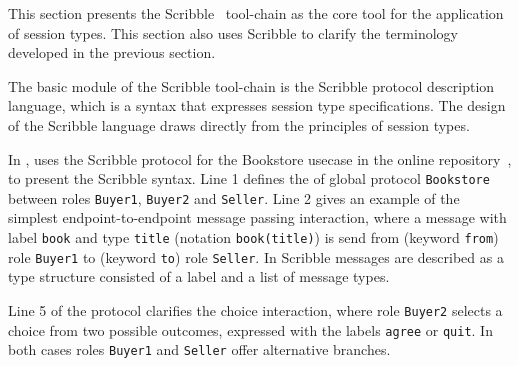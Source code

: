 This section presents the Scribble~\cite{scribble} tool-chain
as the core tool for the application of session types.
This section also uses Scribble to clarify the terminology
developed in the previous section.

The basic module of the Scribble tool-chain is the
Scribble protocol description language,
which is a syntax that expresses session type specifications.
The design of the Scribble language draws directly from
the principles of session types.





In , uses the Scribble protocol for the
Bookstore usecase in the online repository~\cite{usecase_repository},
to present the Scribble syntax.
Line 1 defines the 
of global protocol \lstinline|Bookstore| between
roles \lstinline|Buyer1|, \lstinline|Buyer2| and \lstinline|Seller|.
Line 2 gives an example of the simplest endpoint-to-endpoint
message passing interaction,
where a message with
label \lstinline|book| and type \lstinline|title| (notation \lstinline|book(title)|)
is send from (keyword \lstinline|from|) role \lstinline|Buyer1| to (keyword \lstinline|to|)
role \lstinline{Seller}.
In Scribble messages are described as a type structure
consisted of a label and a list of message types.


Line 5 of the protocol clarifies the choice interaction, where
role \lstinline|Buyer2| selects a choice from two possible outcomes,
expressed with the labels \lstinline|agree| or \lstinline|quit|. In 
both cases roles \lstinline|Buyer1| and \lstinline|Seller| offer
alternative branches.









